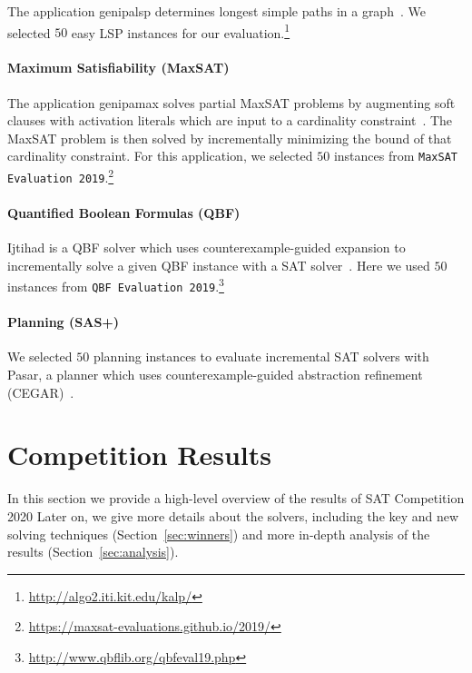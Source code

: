 \documentclass{elsarticle}
\begin{document}
The application \textsf{genipalsp} determines longest simple paths in a graph~\cite{Balyo:2019:LSP}. 
We selected $50$ easy LSP instances for our evaluation.\footnote{\url{http://algo2.iti.kit.edu/kalp/}} 

\paragraph{Maximum Satisfiability (MaxSAT)}

The application \textsf{genipamax} solves partial MaxSAT problems by augmenting soft clauses with activation literals which are input to a cardinality constraint~\cite{Philipp:2015:PBLib}. 
The MaxSAT problem is then solved by incrementally minimizing the bound of that cardinality constraint. 
For this application, we selected $50$ instances from \texttt{MaxSAT Evaluation 2019}.\footnote{\url{https://maxsat-evaluations.github.io/2019/}}

\paragraph{Quantified Boolean Formulas (QBF)}
\textsf{Ijtihad} is a QBF solver which uses counter\-example-guided expansion to incrementally solve a given QBF instance with a SAT solver~\cite{Bloem:2018:QBFSAT}. 
Here we used $50$ instances from \texttt{QBF Evaluation 2019}.\footnote{\url{http://www.qbflib.org/qbfeval19.php}}

\paragraph{Planning (SAS+)}
We selected $50$ planning instances to evaluate incremental SAT solvers with \textsf{Pasar}, a planner which uses counter\-example-guided abstraction refinement (CEGAR)~\cite{Froleyks:2019:Pasar}. 


\section{Competition Results}
\label{sec:results}

In this section we provide a high-level overview of the results of SAT Competition 2020
Later on, we give more details about the solvers, including the key and new solving techniques
(Section~\ref{sec:winners}) and more in-depth analysis of the results (Section~\ref{sec:analysis}).
\end{document}
